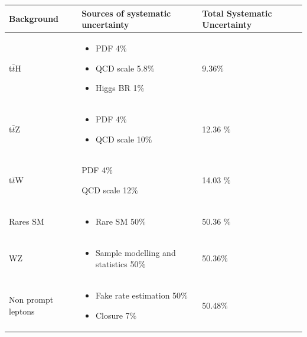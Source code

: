 \begin{linenumbers}
\begin{tabular}{|l|p{6cm}|l|}
\hline
{Background}& {Sources of systematic uncertainty}&{Total Systematic Uncertainty} \\
\hline
t$\bar{t}$H  & \begin{itemize}
 	\item PDF 4$\%$ 
 	\item QCD scale 5.8$\%$
 	\item Higgs BR  1$\%$ 
 	\end{itemize}
 & 9.36$\%$ \\
 \hline  
 t$\bar{t}$Z&\begin{itemize} 
 			\item PDF 4$\%$ 
 			\item QCD scale 10$\%$ 
 \end{itemize} & 12.36 $\%$ \\
 \hline
 t$\bar{t}$W&{\begin{itemize} { 
 			\item PDF 4$\%$ 
 			\item QCD scale 12$\%$ 
 		}
 \end{itemize}} &14.03 $\%$ \\
 \hline
 {Rares SM} & {\begin{itemize} 
				\item Rare SM 50$\%$ 
	\end{itemize}}&50.36 $\%$ \\
	\hline
	{WZ} & \begin{itemize}
				\item Sample modelling and statistics 50$\%$ 
	\end{itemize} & 50.36$\%$ \\
	\hline 
	{Non prompt leptons} & \begin{itemize} 
				\item Fake rate estimation 50$\%$
				\item Closure 7$\%$ 
	\end{itemize} 		 & 50.48$\%$ \\
	\hline 
\end{tabular}


\end{linenumbers}

